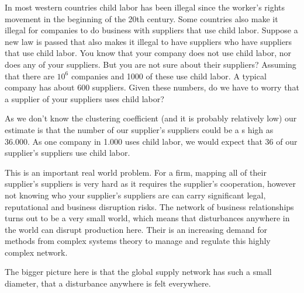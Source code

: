 
In most western countries child labor has been illegal since the worker's rights movement in the beginning of the 20th century. Some countries also make it illegal for companies to do business with suppliers that use child labor. Suppose a new law is passed that also makes it illegal to have suppliers who have suppliers that use child labor. You know that your company does not use child labor, nor does any of your suppliers. But you are not sure about their suppliers? Assuming that there are $10^6$ companies and 1000 of these use child labor. A typical company has about 600 suppliers. Given these numbers, do we have to worry that a supplier of your suppliers uses child labor?

\solution
As we don't know the clustering coefficient (and it is probably relatively low) our estimate is that the number of our supplier's suppliers could be a s high as 36.000. As one company in 1.000 uses child labor, we would expect that 36 of our supplier's suppliers use child labor. 

This is an important real world problem. For a firm, mapping all of their supplier's suppliers is very hard as it requires the supplier's cooperation, however not knowing who your supplier's suppliers are can carry significant legal, reputational and business disruption risks. The network of business relationships turns out to be a very small world, which means that disturbances anywhere in the world can disrupt production here. Their is an increasing demand for methods from complex systems theory to manage and regulate this highly complex network. 

The bigger picture here is that the global supply network has such a small diameter, that a disturbance anywhere is felt everywhere. 
